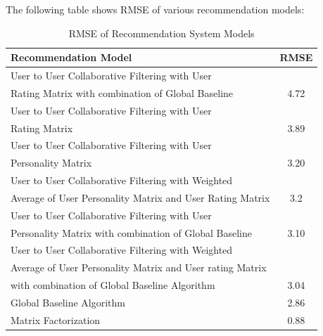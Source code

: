 \documentclass[journal]{IEEEtran}
\begin{document}
The following table shows RMSE of various recommendation models:\\
\FloatBarrier
  \begin{table}[H]
    \centering
        \caption{RMSE of Recommendation System Models}

    \begin{tabular}{| l | c |}
      \hline
      {\bf Recommendation Model} & {\bf RMSE}\\
      \hline
      User to User Collaborative Filtering with User & \\ Rating Matrix with combination of Global Baseline & 4.72\\
      \hline
      User to User Collaborative Filtering with User & \\ Rating Matrix & 3.89\\
      \hline
      User to User Collaborative Filtering with User & \\ Personality Matrix & 3.20\\
      \hline
      User to User Collaborative Filtering with Weighted & \\ Average of User Personality Matrix and User Rating Matrix & 3.2\\
      \hline
      User to User Collaborative Filtering with User & \\ Personality Matrix with combination of Global Baseline & 3.10\\
      \hline
      User to User Collaborative Filtering with Weighted & \\ Average of User Personality Matrix and User rating Matrix & \\ with combination of Global Baseline Algorithm & 3.04\\
      \hline
      Global Baseline Algorithm & 2.86\\
      \hline
      Matrix Factorization & 0.88\\
      \hline
    \end{tabular}
  \end{table}
\end{document}
